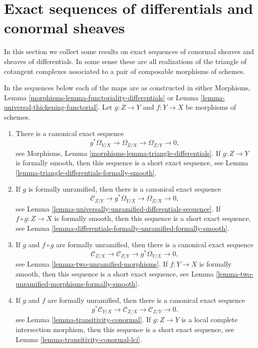 \section{Exact sequences of differentials and conormal sheaves}
\label{section-exact}

\noindent
In this section we collect some results on exact sequences of conormal
sheaves and sheaves of differentials. In some sense these are all
realizations of the triangle of cotangent complexes associated to a pair of
composable morphisms of schemes.

\medskip\noindent
In the sequences below each of the maps
are as constructed in either
Morphisms, Lemma \ref{morphisms-lemma-functoriality-differentials}
or
Lemma \ref{lemma-universal-thickening-functorial}.
Let $g : Z \to Y$ and $f : Y \to X$ be morphisms of schemes.
\begin{enumerate}
\item There is a canonical exact sequence
$$
g^*\Omega_{Y/X} \to \Omega_{Z/X} \to \Omega_{Z/Y} \to 0,
$$
see
Morphisms, Lemma \ref{morphisms-lemma-triangle-differentials}.
If $g : Z \to Y$ is formally smooth, then this sequence is a
short exact sequence, see
Lemma \ref{lemma-triangle-differentials-formally-smooth}.
\item If $g$ is formally unramified, then there is a canonical exact sequence
$$
\mathcal{C}_{Z/Y} \to g^*\Omega_{Y/X} \to \Omega_{Z/X} \to 0,
$$
see
Lemma \ref{lemma-universally-unramified-differentials-sequence}.
If $f \circ g : Z \to X$ is formally smooth, then this sequence is a short
exact sequence, see
Lemma \ref{lemma-differentials-formally-unramified-formally-smooth}.
\item If $g$ and $f \circ g$ are formally unramified, then there is a
canonical exact sequence
$$
\mathcal{C}_{Z/X} \to \mathcal{C}_{Z/Y} \to g^*\Omega_{Y/X} \to 0,
$$
see
Lemma \ref{lemma-two-unramified-morphisms}. If $f : Y \to X$ is formally
smooth, then this sequence is a short exact sequence, see
Lemma \ref{lemma-two-unramified-morphisms-formally-smooth}.
\item If $g$ and $f$ are formally unramified, then there is a canonical
exact sequence
$$
g^*\mathcal{C}_{Y/X} \to \mathcal{C}_{Z/X} \to \mathcal{C}_{Z/Y} \to 0.
$$
see
Lemma \ref{lemma-transitivity-conormal}.
If $g : Z \to Y$ is a local complete intersection morphism, then this
sequence is a short exact sequence, see
Lemma \ref{lemma-transitivity-conormal-lci}.
\end{enumerate}


















